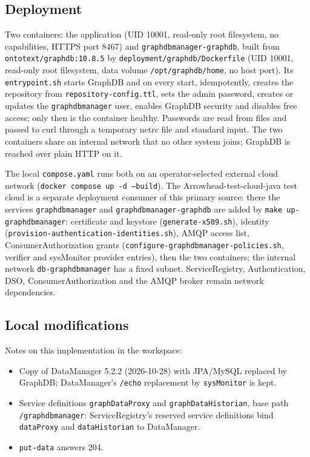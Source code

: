 \documentclass[a4paper]{arrowhead}
\begin{document}
\subsection{Deployment}

Two containers: the application (UID 10001, read-only root filesystem, no capabilities, HTTPS port 8467) and \texttt{graphdbmanager-\allowbreak{}graphdb}, built from \texttt{ontotext/\allowbreak{}graphdb:10.8.5} by \texttt{deployment/\allowbreak{}graphdb/\allowbreak{}Dockerfile} (UID 10001, read-only root filesystem, data volume \texttt{/\allowbreak{}opt/\allowbreak{}graphdb/\allowbreak{}home}, no host port). Its \texttt{entrypoint.sh} starts GraphDB and on every start, idempotently, creates the repository from \texttt{repository-\allowbreak{}config.ttl}, sets the admin password, creates or updates the \texttt{graphdbmanager} user, enables GraphDB security and disables free access; only then is the container healthy. Passwords are read from files and passed to curl through a temporary netrc file and standard input. The two containers share an internal network that no other system joins; GraphDB is reached over plain HTTP on it.

The local \texttt{compose.yaml} runs both on an operator-selected external cloud network (\texttt{docker compose up -d --build}). The Arrowhead-test-cloud-java test cloud is a separate deployment consumer of this primary source: there the services \texttt{graphdbmanager} and \texttt{graphdbmanager-\allowbreak{}graphdb} are added by \texttt{make up-\allowbreak{}graphdbmanager}: certificate and keystore (\texttt{generate-x509.sh}), identity (\texttt{provision-\allowbreak{}authentication-\allowbreak{}identities.sh}), AMQP access list, ConsumerAuthorization grants (\texttt{configure-\allowbreak{}graphdbmanager-\allowbreak{}policies.sh}, verifier and sysMonitor provider entries), then the two containers; the internal network \texttt{db-\allowbreak{}graphdbmanager} has a fixed subnet. ServiceRegistry, Authentication, DSO, ConsumerAuthorization and the AMQP broker remain network dependencies.

\subsection{Local modifications}
\label{sec:local}

Notes on this implementation in the workspace:
\begin{itemize}
  \item Copy of DataManager 5.2.2 (2026-10-28) with JPA/MySQL replaced by GraphDB; DataManager's \texttt{/\allowbreak{}echo} replacement by \texttt{sysMonitor} is kept.
  \item Service definitions \texttt{graphDataProxy} and \texttt{graphDataHistorian}, base path \texttt{/\allowbreak{}graphdbmanager}: ServiceRegistry's reserved service definitions bind \texttt{dataProxy} and \texttt{dataHistorian} to DataManager.
  \item \texttt{put-\allowbreak{}data} answers 204.
\end{itemize}
\end{document}
